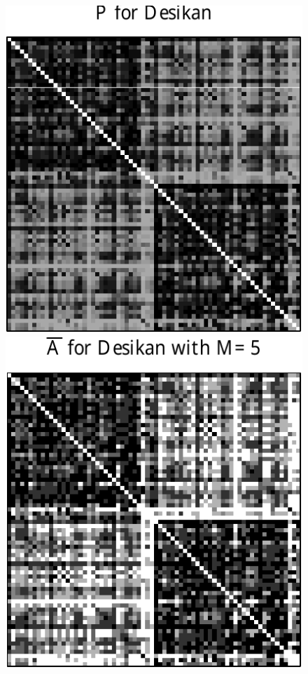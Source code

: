 \documentclass[10pt,letterpaper]{article}
\begin{document}
\begin{figure}[!htb]
\centering
\includegraphics[height=.18\textheight]{P_desikan.pdf} 
\includegraphics[height=.182\textheight]{Abar_desikan_m5.pdf} 

\end{figure}
\end{document}
